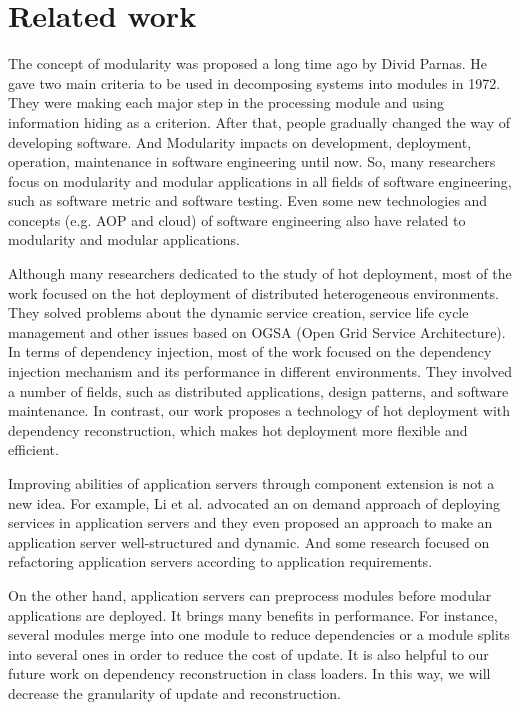 \documentclass[conference]{IEEEtran}
\begin{document}
\section{Related work\label{sec:relatedwork}}

The concept of modularity was proposed a long time ago by Divid Parnas\cite{Divid_specification}.
He gave two main criteria\cite{Divid_criteria} to be used in decomposing systems into modules in 1972.
They were making each major step in the processing module and using information hiding as a criterion.
After that, people gradually changed the way of developing software.
And Modularity impacts on development, deployment, operation, maintenance in software engineering until now.
So, many researchers focus on modularity and modular applications in all fields of software engineering, such as software metric\cite{module_metric} and software testing\cite{module_test}.
Even some new technologies and concepts (e.g. AOP\cite{module_aop} and cloud\cite{module_cloud}) of software engineering also have related to modularity and modular applications.

Although many researchers dedicated to the study of hot deployment, most of the work focused on the hot deployment of distributed heterogeneous environments\cite{related_hot_1, related_hot_2, related_hot_3, related_hot_4}.
They solved problems about the dynamic service creation, service life cycle management and other issues based on OGSA (Open Grid Service Architecture).
In terms of dependency injection, most of the work focused on the dependency injection mechanism and its performance in different environments\cite{related_DI_1, related_DI_2, related_DI_3}.
They involved a number of fields, such as distributed applications, design patterns, and software maintenance.
In contrast, our work proposes a technology of hot deployment with dependency reconstruction, which makes hot deployment more flexible and efficient.

Improving abilities of application servers through component extension is not a new idea.
For example, Li et al. advocated an on demand approach of deploying services in application servers\cite{related_AS_1} and they even proposed an approach to make an application server well-structured and dynamic\cite{related_AS_2}.
And some research focused on refactoring application servers according to application requirements\cite{related_AS_3}.
	
On the other hand, application servers can preprocess modules before modular applications are deployed.
It brings many benefits in performance. For instance, several modules merge into one module to reduce dependencies\cite{related_merge} or a module splits into several ones in order to reduce the cost of update\cite{related_split}.
It is also helpful to our future work on dependency reconstruction in class loaders.
In this way, we will decrease the granularity of update and reconstruction.
\end{document}
